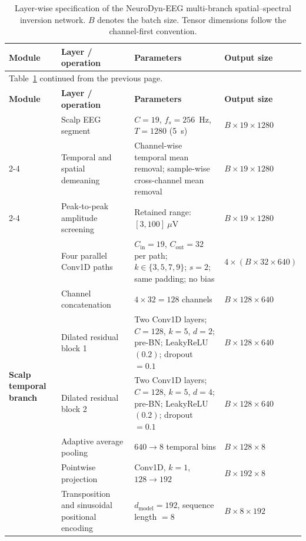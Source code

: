 \documentclass[11pt]{article}
\begin{document}
{\small
\setlength{\tabcolsep}{3pt}
\renewcommand{\arraystretch}{1.08}
\begin{longtable}{p{}p{}p{}p{}}
\caption{Layer-wise specification of the NeuroDyn-EEG multi-branch spatial--spectral inversion network. $B$ denotes the batch size. Tensor dimensions follow the channel-first convention.}
\label{tab:supp_neurodyn_architecture}\\
\toprule
\textbf{Module} & \textbf{Layer / operation} & \textbf{Parameters} & \textbf{Output size} \\
\midrule
\endfirsthead
\multicolumn{4}{l}{\small Table~\ref{tab:supp_neurodyn_architecture} continued from the previous page.}\\
\toprule
\textbf{Module} & \textbf{Layer / operation} & \textbf{Parameters} & \textbf{Output size} \\
\midrule
\endhead
\bottomrule
\endfoot

\multirow{3}{0.16\textwidth}{\textbf{Input and preprocessing}}
& Scalp EEG segment & $C=19$, $f_s=256$~Hz, $T=1280$ (5~s) & $B\times19\times1280$ \\
\cmidrule(l){2-4}
& Temporal and spatial demeaning & Channel-wise temporal mean removal; sample-wise cross-channel mean removal & $B\times19\times1280$ \\
\cmidrule(l){2-4}
& Peak-to-peak amplitude screening & Retained range: $[3,100]~\mu$V & $B\times19\times1280$ \\
\midrule

\multirow{7}{0.16\textwidth}{\textbf{Scalp temporal branch}}
& Four parallel Conv1D paths & $C_{\mathrm{in}}=19$, $C_{\mathrm{out}}=32$ per path; $k\in\{3,5,7,9\}$; $s=2$; same padding; no bias & $4\times(B\times32\times640)$ \\
\cmidrule(l){2-4}
& Channel concatenation & $4\times32=128$ channels & $B\times128\times640$ \\
\cmidrule(l){2-4}
& Dilated residual block 1 & Two Conv1D layers; $C=128$, $k=5$, $d=2$; pre-BN; LeakyReLU$(0.2)$; dropout $=0.1$ & $B\times128\times640$ \\
\cmidrule(l){2-4}
& Dilated residual block 2 & Two Conv1D layers; $C=128$, $k=5$, $d=4$; pre-BN; LeakyReLU$(0.2)$; dropout $=0.1$ & $B\times128\times640$ \\
\cmidrule(l){2-4}
& Adaptive average pooling & $640\rightarrow8$ temporal bins & $B\times128\times8$ \\
\cmidrule(l){2-4}
& Pointwise projection & Conv1D, $k=1$, $128\rightarrow192$ & $B\times192\times8$ \\
\cmidrule(l){2-4}
& Transposition and sinusoidal positional encoding & $d_{\mathrm{model}}=192$, sequence length $=8$ & $B\times8\times192$ \\
\midrule


\end{longtable}}
\end{document}
